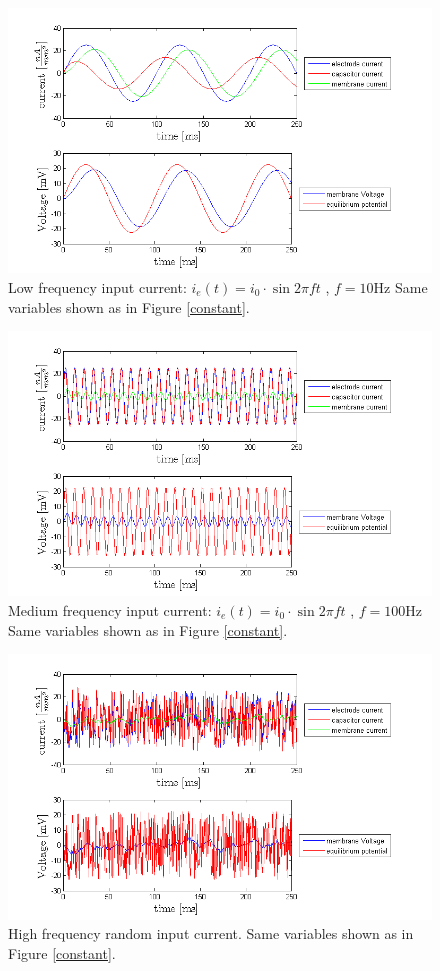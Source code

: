 \documentclass{scrartcl}
\begin{document}
\begin{figure}
\centering
\includegraphics[trim = {1.3cm 0 2cm 0.9cm}, width=\textwidth, clip]{../pics/low}
\caption{\small{Low frequency input current: $i_e(t) = i_0 \cdot \sin{2\pi f t}$ , $f = 10\si{\hertz}$} Same variables shown as in Figure \ref{constant}.}
\end{figure}

\begin{figure}
\centering
\includegraphics[trim = {1.3cm 0 2cm 0.9cm}, width=\textwidth, clip]{../pics/medium}
\caption{\small{Medium frequency input current: $i_e(t) = i_0 \cdot \sin{2\pi f t}$ , $f = 100\si{\hertz}$} Same variables shown as in Figure \ref{constant}.}
\end{figure}

\begin{figure}
\centering
\includegraphics[trim = {1.3cm 0 2cm 0.9cm}, width=\textwidth, clip]{../pics/random}
\caption{\small{High frequency random input current. Same variables shown as in Figure \ref{constant}.}}
\end{figure}
\end{document}

